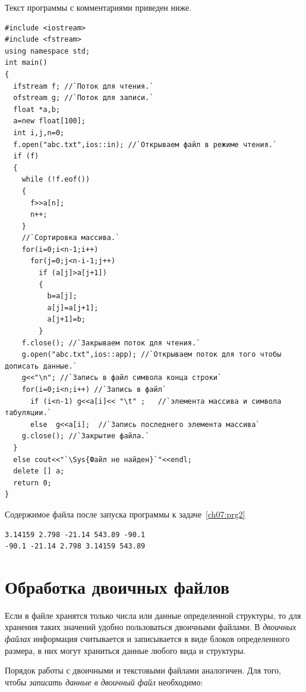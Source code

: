 Текст программы с комментариями приведен ниже. %
\begin{lstlisting}
#include <iostream>
#include <fstream>
using namespace std;
int main()
{
  ifstream f; //`Поток для чтения.`
  ofstream g; //`Поток для записи.`
  float *a,b;
  a=new float[100];
  int i,j,n=0;
  f.open("abc.txt",ios::in); //`Открываем файл в режиме чтения.`
  if (f)	
  {
    while (!f.eof())
    {
      f>>a[n];
      n++;
    }
    //`Сортировка массива.`
    for(i=0;i<n-1;i++)
      for(j=0;j<n-i-1;j++)
        if (a[j]>a[j+1])
        {
          b=a[j];
          a[j]=a[j+1];
          a[j+1]=b;
        }
    f.close(); //`Закрываем поток для чтения.`
    g.open("abc.txt",ios::app); //`Открываем поток для того чтобы дописать данные.`
    g<<"\n"; //`Запись в файл символа конца строки` 
    for(i=0;i<n;i++) //`Запись в файл`
      if (i<n-1) g<<a[i]<< "\t" ;	//`элемента массива и символа табуляции.`
      else  g<<a[i];  //`Запись последнего элемента массива`
    g.close(); //`Закрытие файла.`
  }
  else cout<<"`\Sys{Файл не найден}`"<<endl;
  delete [] a;
  return 0;
}
\end{lstlisting}

Содержимое файла  после запуска программы к задаче~\ref{ch07:prg2}
\begin{verbatim}
3.14159 2.798 -21.14 543.89 -90.1
-90.1 -21.14 2.798 3.14159 543.89
\end{verbatim}


\section[Обработка двоичных файлов]{Обработка двоичных файлов}
Если в файле хранятся только числа или данные определенной структуры, то для хранения таких значений удобно пользоваться
двоичными файлами. В \emph{двоичных файлах} информация считывается и записывается в
виде блоков определенного размера, в них могут храниться данные любого вида и структуры.

Порядок работы с двоичными и текстовыми файлами аналогичен. Для того, чтобы
\emph{записать данные в двоичный файл} необходимо:

